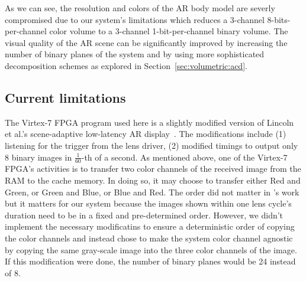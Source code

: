 As we can see, the resolution and colors of the AR body model are severly compromised due to our system's limitations which reduces a 3-channel 8-bits-per-channel color volume to a 3-channel 1-bit-per-channel binary volume.
The visual quality of the AR scene can be significantly improved by increasing the number of binary planes of the system and by using more sophisticated decomposition schemes as explored in Section~\ref{sec:volumetric:acd}.

\subsection{Current limitations}
\label{sec:volumetric:rts:limitations}
The Virtex-7 FPGA program used here is a slightly modified version of Lincoln et al.'s scene-adaptive low-latency AR display~\cite{Lincoln2017scene}.
The modifications include (1) listening for the trigger from the lens driver, (2) modified timings to output only 8 binary images in $\frac{1}{60}$-th of a second.
As mentioned above, one of the Virtex-7 FPGA's activities is to transfer two color channels of the received image from the RAM to the cache memory.
In doing so, it may choose to transfer either Red and Green, or Green and Blue, or Blue and Red.
The order did not matter in \cite{Lincoln2017scene}'s work but it matters for our system because the images shown within one lens cycle's duration need to be in a fixed and pre-determined order. 
However, we didn't implement the necessary modificatins to ensure a deterministic order of copying the color channels and instead chose to make the system color channel agnostic by copying the same gray-scale image into the three color channels of the image. 
If this modification were done, the number of binary planes would be 24 instead of 8.


